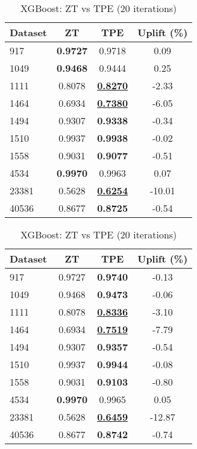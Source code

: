 \begin{table}[htbp]
\begin{center}
\begin{small}
\begin{sc}
\begin{subtable}[t]{0.48\textwidth}
    \centering
    \caption{XGBoost: ZT vs TPE (10 iterations)}
    \label{tab:xgboost-zt-vs-tpe-10}
    \begin{tabular}{lccc}
    \toprule
    \textbf{Dataset} & \textbf{ZT} & \textbf{TPE} & \textbf{Uplift (\%)} \\
    \midrule
    917    & \textbf{0.9727} & 0.9718 & 0.09 \\
    1049    & \textbf{0.9468} & 0.9444 & 0.25 \\
    1111    & 0.8078 & \underline{\textbf{0.8270}} & -2.33 \\
    1464    & 0.6934 & \underline{\textbf{0.7380}} & -6.05 \\
    1494    & 0.9307 & \textbf{0.9338} & -0.34 \\
    1510    & 0.9937 & \textbf{0.9938} & -0.02 \\
    1558    & 0.9031 & \textbf{0.9077} & -0.51 \\
    4534    & \textbf{0.9970} & 0.9963 & 0.07 \\
    23381    & 0.5628 & \underline{\textbf{0.6254}} & -10.01 \\
    40536    & 0.8677 & \textbf{0.8725} & -0.54 \\
    \bottomrule
    \end{tabular}
\end{subtable}
\hfill
\begin{subtable}[t]{0.48\textwidth}
    \centering
    \caption{XGBoost: ZT vs TPE (20 iterations)}
    \label{tab:xgboost-zt-vs-tpe-20}
    \begin{tabular}{lccc}
    \toprule
    \textbf{Dataset} & \textbf{ZT} & \textbf{TPE} & \textbf{Uplift (\%)} \\
    \midrule
    917    & 0.9727 & \textbf{0.9740} & -0.13 \\
    1049    & 0.9468 & \textbf{0.9473} & -0.06 \\
    1111    & 0.8078 & \underline{\textbf{0.8336}} & -3.10 \\
    1464    & 0.6934 & \underline{\textbf{0.7519}} & -7.79 \\
    1494    & 0.9307 & \textbf{0.9357} & -0.54 \\
    1510    & 0.9937 & \textbf{0.9944} & -0.08 \\
    1558    & 0.9031 & \textbf{0.9103} & -0.80 \\
    4534    & \textbf{0.9970} & 0.9965 & 0.05 \\
    23381    & 0.5628 & \underline{\textbf{0.6459}} & -12.87 \\
    40536    & 0.8677 & \textbf{0.8742} & -0.74 \\
    \bottomrule
    \end{tabular}
\end{subtable}

\end{sc}
\end{small}
\end{center}
\vskip -0.1in
\end{table}